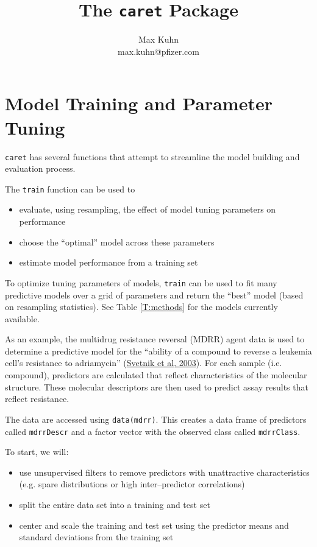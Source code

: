 \documentclass[12pt]{article}
\title{The {\tt caret} Package}
\author{Max Kuhn \\ max.kuhn@pfizer.com}
\begin{document}
\maketitle

\thispagestyle{empty}
	

\section{Model Training and Parameter Tuning}\label{S:train}

\texttt{caret} has several functions that attempt to streamline the model building and evaluation process. 

The \texttt{train} function can be used to
\begin{itemize}
   \item evaluate, using resampling, the effect of model tuning parameters on performance
   \item choose the ``optimal'' model across these parameters 
   \item estimate model performance from a training set
\end{itemize}

To optimize tuning parameters of models, \texttt{train} can be used to fit many predictive models over a grid of parameters and return the ``best'' model (based on resampling statistics). See Table \ref{T:methods} for the models currently available.

As an example, the multidrug resistance reversal (MDRR) agent data is used to determine a predictive model for the ``ability of a compound to reverse a leukemia cell's resistance to adriamycin'' (\href{http://pubs.acs.org/cgi-bin/abstract.cgi/jcisd8/2005/45/i03/abs/ci0500379.html}{Svetnik et al, 2003}). For each sample (i.e. compound), predictors are calculated that reflect characteristics of the molecular structure. These molecular descriptors are then used to predict assay results that reflect resistance. 

The data are accessed using \texttt{data(mdrr)}. This creates a data frame of predictors called \texttt{mdrrDescr} and a factor vector with the observed class called \texttt{mdrrClass}.

To start, we will:
 
\begin{itemize}
   \item use unsupervised filters to remove predictors with unattractive characteristics (e.g. spare distributions or high inter--predictor correlations)
   \item split the entire data set into a training and test set
   \item center and scale the training and test set using the predictor means and standard deviations from the training set
\end{itemize}
\end{document}
